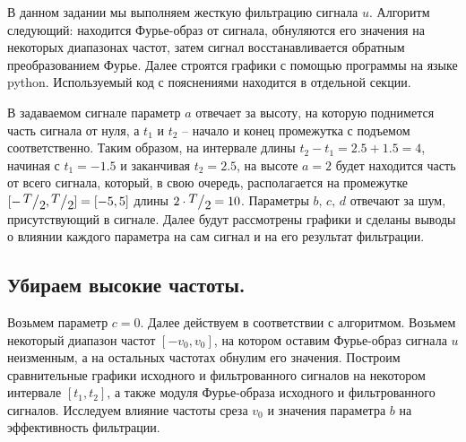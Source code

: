 \documentclass[a4paper, 16pt]{article}
\newcommand{\frc}[2]{\raisebox{2pt}{$#1$}\big/\raisebox{-3pt}{$#2$}}
\begin{document}
    В данном задании мы выполняем жесткую фильтрацию сигнала $u$. Алгоритм следующий: находится Фурье-образ от сигнала,
    обнуляются его значения на некоторых диапазонах частот, затем сигнал восстанавливается обратным преобразованием Фурье.
    Далее строятся графики с помощью программы на языке python. Используемый код с пояснениями находится в отдельной секции.


    В задаваемом сигнале параметр $a$ отвечает за высоту, на которую поднимется часть сигнала от нуля, а $t_1 \text{ и } t_2$ -- начало
    и конец промежутка с подъемом соответственно. Таким образом, на интервале длины $t_2-t_1=2.5+1.5=4$, начиная с $t_1=-1.5$ и заканчивая $t_2=2.5$,
    на высоте $a=2$ будет находится часть от всего сигнала, который, в свою очередь, располагается на промежутке $[-\,\frc{T}{2},\frc{T}{2}]=[-5,5]$
    длины $2\cdot \frc{T}{2}=10$. Параметры $b,\,c,\,d$ отвечают за шум, присутствующий в сигнале. Далее будут рассмотрены графики и сделаны выводы о
    влиянии каждого параметра на сам сигнал и на его результат фильтрации.


    \subsection{Убираем высокие частоты.}
    Возьмем параметр $c=0$. Далее действуем в соответствии с алгоритмом. Возьмем некоторый диапазон частот $[-v_0, v_0]$, на котором оставим Фурье-образ
    сигнала $u$ неизменным, а на остальных частотах обнулим его значения. Построим сравнительные графики исходного и фильтрованного сигналов на некотором
    интервале $[t_1,t_2]$, а также модуля Фурье-образа исходного и фильтрованного сигналов. Исследуем влияние частоты среза $v_0$ и значения параметра $b$
    на эффективность фильтрации.
    
\end{document}
